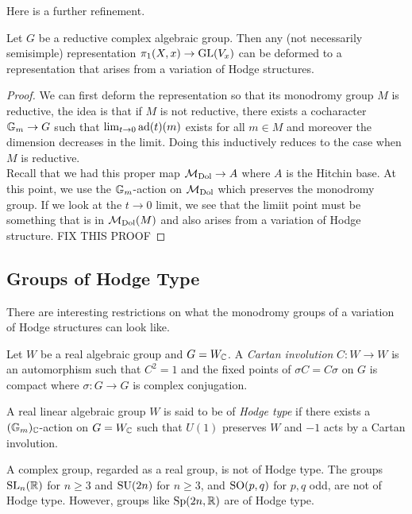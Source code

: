 \documentclass[12pt]{article}
\begin{document}
Here is a further refinement.

\begin{theorem}
Let $G$ be a reductive complex algebraic group. Then any (not necessarily semisimple) representation $\pi_1(X, x) \to \mathrm{GL}(V_x)$ can be deformed to a representation that arises from a variation of Hodge structures.
\end{theorem}

\begin{proof}
We can first deform the representation so that its monodromy group $M$ is reductive, the idea is that if $M$ is not reductive, there exists a cocharacter $\mathbb{G}_m \to G$ such that $\lim_{t \to 0} \mathrm{ad}(t)(m)$ exists for all $m \in M$ and moreover the dimension decreases in the limit. Doing this inductively reduces to the case when $M$ is reductive.
\bigskip\\
Recall that we had this proper map $\mathcal{M}_{\mathrm{Dol}} \to A$ where $A$ is the Hitchin base. At this point, we use the $\mathbb{G}_m$-action on $\mathcal{M}_{\mathrm{Dol}}$ which preserves the monodromy group. If we look at the $t \to 0$ limit, we see that the limiit point must be something that is in $\mathcal{M}_{\mathrm{Dol}}(M)$ and also arises from a variation of Hodge structure. {\color{red} FIX THIS PROOF}
\end{proof}

\subsection{Groups of Hodge Type}

There are interesting restrictions on what the monodromy groups of a variation of Hodge structures can look like.

\begin{defn}
Let $W$ be a real algebraic group and $G = W_{\mathbb{C}}$. A \textit{Cartan involution} $C : W \to W$ is an automorphism such that $C^2 = 1$ and the fixed points of $\sigma C = C \sigma$ on $G$ is compact where $\sigma : G \to G$ is complex conjugation.
\end{defn}

\begin{defn}
A real linear algebraic group $W$ is said to be of \textit{Hodge type} if there exists a $(\mathbb{G}_m)_{\mathbb{C}}$-action on $G = W_{\mathbb{C}}$ such that $U(1)$ preserves $W$ and $-1$ acts by a Cartan involution.
\end{defn}

\begin{example}
A complex group, regarded as a real group, is not of Hodge type. The groups $\mathrm{SL}_n(\mathbb{R})$ for $n \ge 3$ and $\mathrm{SU}(2n)$ for $n \ge 3$, and $\mathrm{SO}(p,q)$ for $p,q$ odd, are not of Hodge type. However, groups like $\mathrm{Sp}(2n, \mathbb{R})$ are of Hodge type.
\end{example}
\end{document}
